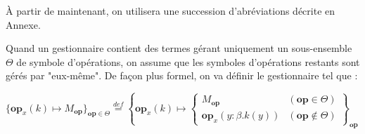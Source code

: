 	À partir de maintenant, on utilisera une succession d'abréviations décrite en Annexe.
	\medbreak
	
	\begin{definition}\label{fctnOp}
		Quand un gestionnaire contient des termes gérant uniquement un sous-ensemble $\Theta$ de symbole d'opérations, on assume que les symboles d'opérations restants sont gérés par "eux-même". De façon plus formel, on va définir le gestionnaire tel que :
		
		
		\begin{center}
			$ \{\textbf{op}_x(k) \mapsto M_\textbf{op}\}_{\textbf{op} \in \Theta} \overset{def}{=}
			\left \{ \textbf{op}_x(k) \mapsto
			\left \{ 
			\begin{array}{lr}
			M_\textbf{op}&(\textbf{op} \in \Theta) \\
			\textbf{op}_x(y:\beta.k(y))&(\textbf{op} \notin \Theta)
			\end{array}
			\right \}
			\right .
			_\textbf{op}$ 
		\end{center}
	\end{definition}



